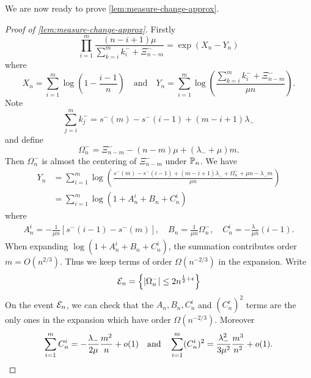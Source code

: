 We are now ready to prove \cref{lem:measure-change-approx}.
\begin{proof}[Proof of \cref{lem:measure-change-approx}]
    Firstly
    \begin{equation*}
        \prod_{i=1}^m \frac{(n-i+1)\mu}{\sum_{k=i}^m k^-_i + \Xi^-_{n-m}} = \exp(X_n - Y_n)
    \end{equation*}
    where
    \begin{equation*}
        X_n = \sum_{i=1}^m \log\left( 1 - \frac{i-1}{n} \right)
        \quad \text{and} \quad
        Y_n = \sum_{i=1}^m \log\left( \frac{\sum_{k=i}^m k_i^- + \Xi^-_{n-m}}{\mu n} \right).
    \end{equation*}
    Note
    \begin{equation*}
        \sum_{j=i}^m k^-_j = s^-(m) - s^-(i - 1) + (m - i + 1) \lambda_-
    \end{equation*}
    and define
    \begin{equation*}
        \Omega^-_n = \Xi^-_{n-m} - (n-m)\mu + (\lambda_- + \mu)m.
    \end{equation*}
    Then $\Omega_n^-$ is almost the centering of $\Xi_{n-m}^-$ under $\P_n$. We have
    \begin{align*}
        Y_n 
        &= \sum_{i=1}^m \log \left( \frac{s^-(m) - s^-(i-1) + (m - i + 1) \lambda_- + \Omega^-_n + \mu n - \lambda_- m}{\mu n} \right) \\
        &= \sum_{i=1}^m \log \left( 1 + A_n^i + B_n + C_n^i \right)
    \end{align*}
    where
    \begin{align*}
        A_n^i = - \frac{1}{\mu n} \left[ s^-(i-1) - s^-(m) \right], \quad
        B_n = \frac{1}{\mu n} \Omega^-_n, \quad
        C_n^i = - \frac{\lambda_-}{\mu n} (i-1).
    \end{align*}
    When expanding $\log(1 + A_n^i + B_n + C_n^i)$, the summation contributes order $m = O(n^{2/3})$. Thus we keep terms of order $\Omega(n^{-2/3})$ in the expansion. Write
    \begin{equation*}
        \omegaevent_n = \left\{ \abs{\Omega^-_n} \leq 2n^{\frac{1}{2} + \epsilon} \right\}
    \end{equation*}
    On the event $\omegaevent_n$, we can check that the $A_n, B_n, C_n^i$ and $(C_n^i)^2$ terms are the only ones in the expansion which have order $\Omega(n^{-2/3})$. Moreover
    \begin{equation*}
        \sum_{i=1}^m C_n^i = - \frac{\lambda_-}{2 \mu} \frac{m^2}{n} + \littleo(1) \quad \text{and} \quad
        \sum_{i=1}^m (C_n^i)^2 = \frac{\lambda_-^2}{3 \mu^2} \frac{m^3}{n^2} + \littleo(1).

\end{equation*}
\end{proof}
